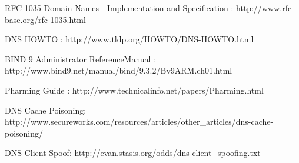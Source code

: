  
\begin{thebibliography}{10}

RFC 1035 Domain Names - Implementation and Specification :
\newblock http://www.rfc-base.org/rfc-1035.html

DNS HOWTO :
\newblock http://www.tldp.org/HOWTO/DNS-HOWTO.html

BIND 9 Administrator ReferenceManual :
\newblock http://www.bind9.net/manual/bind/9.3.2/Bv9ARM.ch01.html

Pharming Guide :
\newblock http://www.technicalinfo.net/papers/Pharming.html

DNS Cache Poisoning:
\newblock http://www.secureworks.com/resources/articles/other\_articles/dns-cache-poisoning/

DNS Client Spoof:
\newblock http://evan.stasis.org/odds/dns-client\_spoofing.txt


\end{thebibliography}

